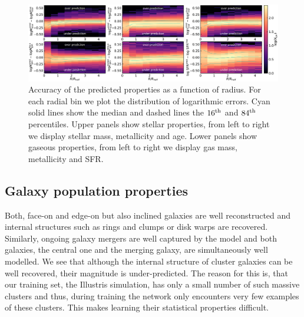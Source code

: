 \documentclass[conference]{IEEEtran}
\begin{document}
\begin{figure}
\begin{center}
\includegraphics[width=\textwidth]{./plots/radial_dependence_masked_ugriz.pdf}
\end{center}
\vspace{-.35cm}
\caption{Accuracy of the predicted properties as a function of radius. For each radial bin we plot the distribution of logarithmic errors. Cyan solid lines show the median and dashed lines the $16^{\rm th}$ and $84^{\rm th}$ percentiles. Upper panels show stellar properties, from left to right we display stellar mass, metallicity and age. Lower panels show gaseous properties, from left to right we display gas mass, metallicity and SFR.}
\label{fig:true_vs_pred_rad}
\end{figure}

\subsection{Galaxy population properties}

Both, face-on and edge-on but also inclined galaxies are well reconstructed and internal structures such as rings and clumps or disk warps are recovered.
Similarly, ongoing galaxy mergers are well captured by the model and both galaxies, the central one and the merging galaxy, are simultaneously well modelled. 
We see that although the internal structure of cluster galaxies can be well recovered, their magnitude is under-predicted. The reason for this is, that our training set, the Illustris simulation, has only a small number of such massive clusters and thus, during training the network only encounters very few examples of these clusters. This makes learning their statistical properties difficult.
\end{document}
